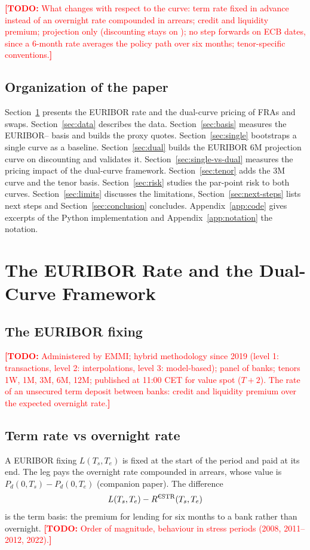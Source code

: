 \documentclass[11pt,a4paper]{article}
\theoremstyle{plain}
\theoremstyle{definition}
\newcommand{\estr}{\text{\texteuro STR}}
\newcommand{\todo}[1]{\textcolor{red}{\textbf{[TODO:} #1\textbf{]}}}
\begin{document}
\todo{What changes with respect to the \estr{} curve: term rate fixed in advance instead of an overnight rate compounded in arrears; credit and liquidity premium; projection only (discounting stays on \estr{}); no step forwards on ECB dates, since a 6-month rate averages the policy path over six months; tenor-specific conventions.}

\subsection{Organization of the paper}
Section~\ref{sec:prelim} presents the EURIBOR rate and the dual-curve pricing of FRAs and swaps. Section~\ref{sec:data} describes the data. Section~\ref{sec:basis} measures the EURIBOR--\estr{} basis and builds the proxy quotes. Section~\ref{sec:single} bootstraps a single curve as a baseline. Section~\ref{sec:dual} builds the EURIBOR 6M projection curve on \estr{} discounting and validates it. Section~\ref{sec:single-vs-dual} measures the pricing impact of the dual-curve framework. Section~\ref{sec:tenor} adds the 3M curve and the tenor basis. Section~\ref{sec:risk} studies the par-point risk to both curves. Section~\ref{sec:limits} discusses the limitations, Section~\ref{sec:next-steps} lists next steps and Section~\ref{sec:conclusion} concludes. Appendix~\ref{app:code} gives excerpts of the Python implementation and Appendix~\ref{app:notation} the notation.

\clearpage
\section{The EURIBOR Rate and the Dual-Curve Framework}
\label{sec:prelim}

\subsection{The EURIBOR fixing}
\todo{Administered by EMMI; hybrid methodology since 2019 (level 1: transactions, level 2: interpolations, level 3: model-based); panel of banks; tenors 1W, 1M, 3M, 6M, 12M; published at 11:00 CET for value spot ($T+2$). The rate of an unsecured term deposit between banks: credit and liquidity premium over the expected overnight rate.}

\subsection{Term rate vs overnight rate}
A EURIBOR fixing $L(T_s,T_e)$ is fixed at the start of the period and paid at its end. The \estr{} leg pays the overnight rate compounded in arrears, whose value is $P_d(0,T_s)-P_d(0,T_e)$ (companion paper). The difference
\begin{equation}
    L(T_s,T_e)-R^{\estr}(T_s,T_e)
\end{equation}
is the term basis: the premium for lending for six months to a bank rather than overnight. \todo{Order of magnitude, behaviour in stress periods (2008, 2011--2012, 2022).}
\end{document}

